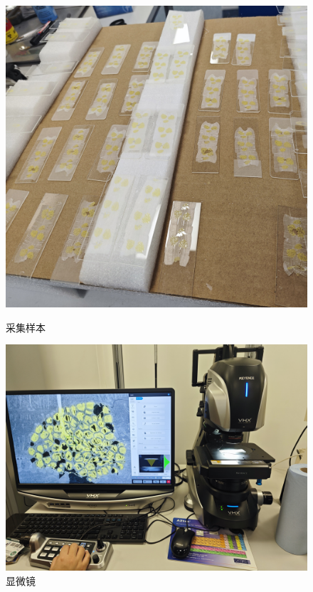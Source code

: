 \begin{figure}[htbp]
\begin{minipage}{0.3\textwidth}
        \includegraphics[width=\textwidth]{./fig/采集样本.jpg}
        \caption{采集样本}
        \label{fig:采集样本}
    \end{minipage}
    \begin{minipage}{0.35\textwidth}
        \centering
        \includegraphics[width=\textwidth]{./fig/显微镜.jpg}
        \caption{显微镜}
        \label{fig:显微镜}
    \end{minipage}
\end{figure}


